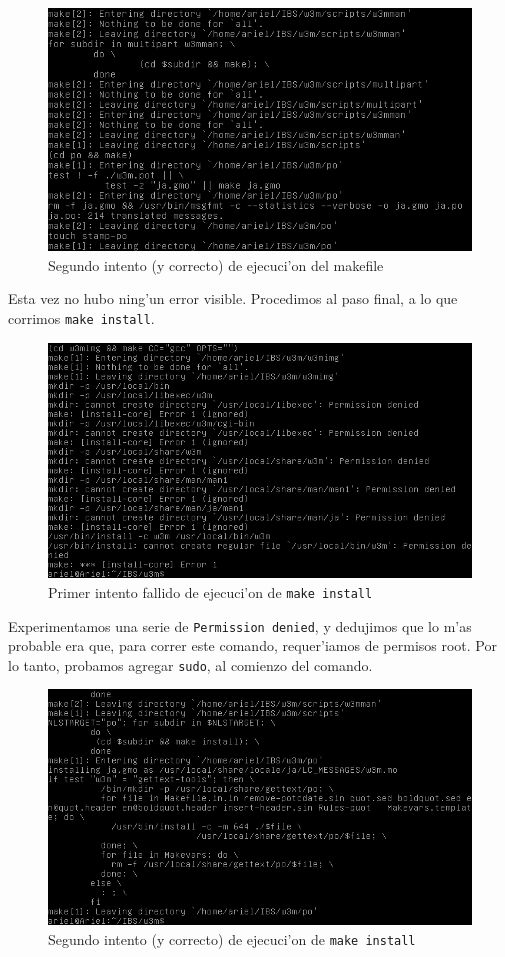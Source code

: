 \documentclass[11pt]{article}
\begin{document}
		\begin{figure}[H]
			\centering \captionsetup{justification=centering}
			\includegraphics[width=.8\linewidth]{Images/Compile_w3m/make_successful}
			\caption{Segundo intento (y correcto) de ejecuci'on del makefile}
			\label{fig:make_successful}
		\end{figure}
		
		Esta vez no hubo ning'un error visible. Procedimos al paso final, a lo que corrimos \texttt{make install}.
		
		\begin{figure}[H]
			\centering \captionsetup{justification=centering}
			\includegraphics[width=.8\linewidth]{Images/Compile_w3m/make-install_fail}
			\caption{Primer intento fallido de ejecuci'on de \texttt{make install}}
			\label{fig:make-install_fail}
		\end{figure}
	
		Experimentamos una serie de \texttt{Permission denied}, y dedujimos que lo m'as probable era que, para correr este comando, requer'iamos de permisos root. Por lo tanto, probamos agregar \texttt{sudo}, al comienzo del comando.
		
		\begin{figure}[H]
			\centering \captionsetup{justification=centering}
			\includegraphics[width=.8\linewidth]{Images/Compile_w3m/make-install_successful}
			\caption{Segundo intento (y correcto) de ejecuci'on de \texttt{make install}}
			\label{fig:make-install_successful}
		\end{figure}
		
\end{document}
